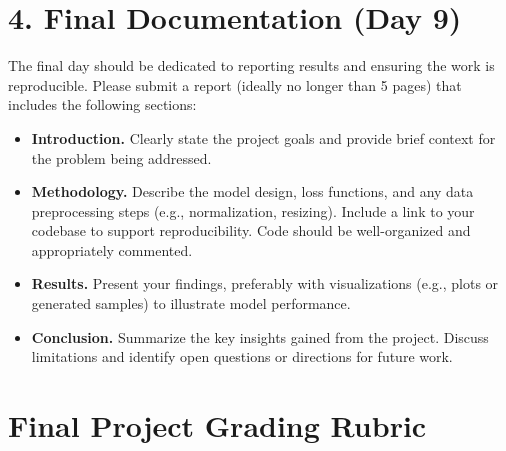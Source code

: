 \documentclass[letterpaper]{inzane_syllabus} %
\begin{document}
\section{4. Final Documentation (Day 9)} The final day should be dedicated to reporting results and ensuring the work is reproducible. Please submit a report (ideally no longer than 5 pages) that includes the following sections:

\begin{itemize}
    \item \textbf{Introduction.} Clearly state the project goals and provide brief context for the problem being addressed.
    
    \item \textbf{Methodology.} Describe the model design, loss functions, and any data preprocessing steps (e.g., normalization, resizing). Include a link to your codebase to support reproducibility. Code should be well-organized and appropriately commented.
    
    \item \textbf{Results.} Present your findings, preferably with visualizations (e.g., plots or generated samples) to illustrate model performance.
    
    \item \textbf{Conclusion.} Summarize the key insights gained from the project. Discuss limitations and identify open questions or directions for future work.
\end{itemize}


\newpage
\makeFullPage
\section{Final Project Grading Rubric}
\end{document}
